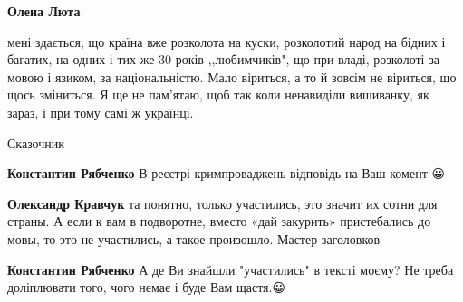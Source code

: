 \begin{itemize}
\begin{itemize}
\textbf{Олена Люта} 

мені здається, що країна вже розколота на куски, розколотий народ на бідних і
багатих, на одних і тих же 30 років ,,любимчиків", що при владі, розколоті за
мовою і язиком, за національністю. Мало віриться, а то й зовсім не віриться, що
щось зміниться. Я ще не пам'ятаю, щоб так коли ненавиділи вишиванку, як зараз,
і при тому самі ж українці.

\end{itemize}

 
Сказочник \Smiley[1.0][yellow]

\begin{itemize}
 
\textbf{Константин Рябченко} В реєстрі кримпроваджень відповідь на Ваш комент 😀

 
\textbf{Олександр Кравчук} та понятно, только участились, это значит их сотни для страны. А если к вам в подворотне, вместо «дай закурить» пристебались до мовы, то это не участились, а такое произошло. Мастер заголовков

 
\textbf{Константин Рябченко} А де Ви знайшли "участились" в тексті моєму? Не треба доліплювати того, чого немає і буде Вам щастя.😀

 

\end{itemize}
\end{itemize}
